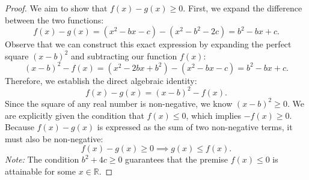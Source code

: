 \documentclass[10pt,a4paper]{amsart}
\begin{document}
\begin{proof}
    We aim to show that $f(x) - g(x) \geq 0$. First, we expand the difference between the two functions:
    \[
        f(x) - g(x) = (x^2 - bx - c) - (x^2 - b^2 - 2c) = b^2 - bx + c.
    \]
    Observe that we can construct this exact expression by expanding the perfect square $(x-b)^2$ and subtracting our function $f(x)$:
    \[
        (x-b)^2 - f(x) = (x^2 - 2bx + b^2) - (x^2 - bx - c) = b^2 - bx + c.
    \]
    Therefore, we establish the direct algebraic identity:
    \[
        f(x) - g(x) = (x-b)^2 - f(x).
    \]
    Since the square of any real number is non-negative, we know $(x-b)^2 \geq 0$. We are explicitly given the condition that $f(x) \leq 0$, which implies $-f(x) \geq 0$. 
    Because $f(x) - g(x)$ is expressed as the sum of two non-negative terms, it must also be non-negative:
    \[
        f(x) - g(x) \geq 0 \implies g(x) \leq f(x).
    \]
    \textit{Note:} The condition $b^2 + 4c \geq 0$ guarantees that the premise $f(x) \leq 0$ is attainable for some $x \in \mathbb{R}$.

\end{proof}
\end{document}
